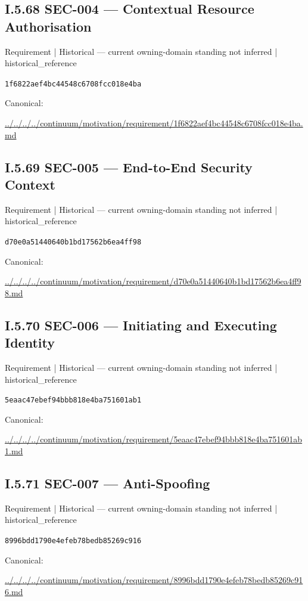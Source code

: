 \documentclass[10pt,a4paper]{article}
\begin{document}
\subsection*{I.5.68 SEC-004 — Contextual Resource Authorisation}
\label{element-1f6822aef4bc44548c6708fcc018e4ba}
{\small Requirement | Historical — current owning-domain standing not inferred | historical\_reference}\par
\texttt{1f6822aef4bc44548c6708fcc018e4ba}\par
Canonical: \par
{\footnotesize\url{../../../../continuum/motivation/requirement/1f6822aef4bc44548c6708fcc018e4ba.md}}\par
\subsection*{I.5.69 SEC-005 — End-to-End Security Context}
\label{element-d70e0a51440640b1bd17562b6ea4ff98}
{\small Requirement | Historical — current owning-domain standing not inferred | historical\_reference}\par
\texttt{d70e0a51440640b1bd17562b6ea4ff98}\par
Canonical: \par
{\footnotesize\url{../../../../continuum/motivation/requirement/d70e0a51440640b1bd17562b6ea4ff98.md}}\par
\subsection*{I.5.70 SEC-006 — Initiating and Executing Identity}
\label{element-5eaac47ebef94bbb818e4ba751601ab1}
{\small Requirement | Historical — current owning-domain standing not inferred | historical\_reference}\par
\texttt{5eaac47ebef94bbb818e4ba751601ab1}\par
Canonical: \par
{\footnotesize\url{../../../../continuum/motivation/requirement/5eaac47ebef94bbb818e4ba751601ab1.md}}\par
\subsection*{I.5.71 SEC-007 — Anti-Spoofing}
\label{element-8996bdd1790e4efeb78bedb85269c916}
{\small Requirement | Historical — current owning-domain standing not inferred | historical\_reference}\par
\texttt{8996bdd1790e4efeb78bedb85269c916}\par
Canonical: \par
{\footnotesize\url{../../../../continuum/motivation/requirement/8996bdd1790e4efeb78bedb85269c916.md}}\par
\end{document}
